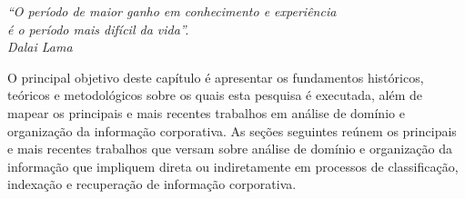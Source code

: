 \label{literatura}

	\begin{flushright}
		\textit{``O período de maior ganho em conhecimento e experiência
		\\ é o período mais difícil da vida''.\\Dalai Lama}
	\end{flushright}




O principal objetivo deste capítulo é apresentar os fundamentos históricos, teóricos e metodológicos sobre os quais esta pesquisa é executada, além de mapear os principais e mais recentes trabalhos em análise de domínio e organização da informação corporativa.
As seções seguintes reúnem os principais e mais recentes trabalhos que versam sobre análise de domínio e organização da informação que impliquem direta ou indiretamente em processos de classificação, indexação e recuperação de informação corporativa.





